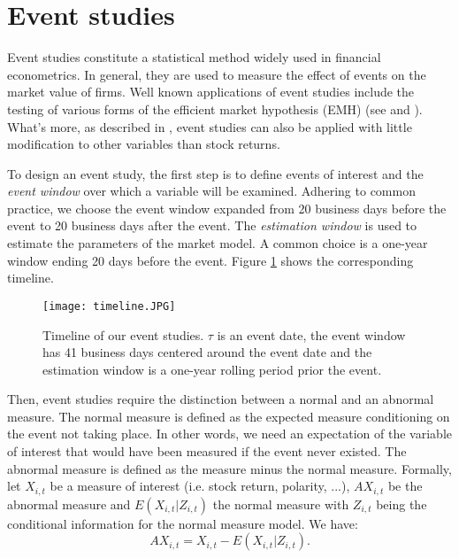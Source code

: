 \section{Event studies}\label{S:event studies}

Event studies constitute a statistical method widely used in financial econometrics. In general, they are used to measure the effect of events on the market value of firms. Well known applications of event studies include the testing of various forms of the efficient market hypothesis (EMH) (see \citet{fama1969} and \citet{fama1991efficient}). What's more, as described in \citet{mackinlay1997event}, event studies can also be applied with little modification to other variables than stock returns. 

To design an event study, the first step is to define events of interest and the \textit{event window} over which a variable will be examined. Adhering to common practice, we choose the event window expanded from 20 business days before the event to 20 business days after the event. The \textit{estimation window} is used to estimate the parameters of the market model. A common choice is a one-year window ending 20 days before the event. Figure \ref{fig:timeline} shows the corresponding timeline. 

\begin{figure}[h]
    \centering
    \texttt{[image: timeline.JPG]}
    \caption{Timeline of our event studies. $\tau$ is an event date, the event window has 41 business days centered around the event date and the estimation window is a one-year rolling period prior the event.}
    \label{fig:timeline}
\end{figure}

Then, event studies require the distinction between a normal and an abnormal measure. The normal measure is defined as the expected measure conditioning on the event not taking place. In other words, we need an expectation of the variable of interest that would have been measured if the event never existed. The abnormal measure is defined as the measure minus the normal measure. Formally, let $X_{i,t}$ be a measure of interest (i.e. stock return, polarity, ...), $AX_{i,t}$ be the abnormal measure and $E(X_{i,t}|Z_{i,t})$ the normal measure with $Z_{i,t}$ being the conditional information for the normal measure model. We have: 
\[     AX_{i,t} = X_{i,t} - E(X_{i,t}|Z_{i,t}).\]

